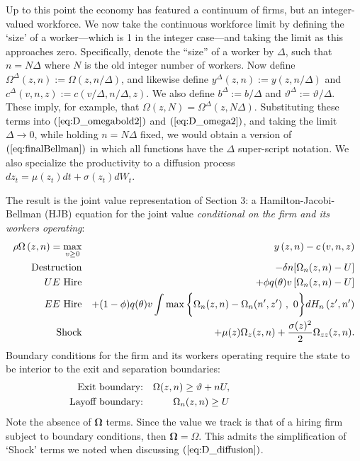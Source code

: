 Up to this point the economy has featured a continuum of firms, but an
integer-valued workforce. We now take the continuous workforce limit by
defining the `size' of a worker---which is 1 in the integer case---and
taking the limit as this approaches zero. Specifically, denote the ``size''
of a worker by $\Delta$, such that $n= N \Delta$ where $N$ is the old
integer number of workers. Now define ${\Omega}^\Delta(z,n) :=
\Omega(z,n/\Delta)$, and likewise define $y^{\Delta}(z,n):=y(z,n/\Delta)$ and
$c^\Delta(v,n,z):=c(v/\Delta,n/\Delta,z)$. We also define ${b}^\Delta:=b/\Delta
$ and ${\vartheta}^{\Delta}:=\vartheta/\Delta$. These imply, for example,
that $\Omega(z,N)={\Omega}^\Delta(z,N\Delta)$. Substituting these terms into
$(\ref{eq:D_omegabold2})$ and $(\ref{eq:D_omega2})$, and taking the limit $%
\Delta\rightarrow 0$, while holding $n=N\Delta$ fixed, we would obtain a
version of $(\ref{eq:finalBellman})$ in which all functions have the $\Delta$
super-script notation. We also specialize the productivity to a diffusion
process $dz_t=\mu(z_t)dt+\sigma(z_t)dW_t$.

The result is the joint value representation of Section 3: a Hamilton-Jacobi-Bellman (HJB) equation for the joint value \emph{conditional on the firm and its workers operating}:
\begin{eqnarray}  \label{eq:finalBellman}
\rho \Omega\left(z,n\right) =\max_{v \geq 0} && y\left(z,n\right) -c\left(
v,n,z\right) \\
\text{Destruction} &&-\delta n [\Omega_n(z,n) - U]  \notag \\
\text{$UE$ Hire} &&+\phi q(\theta)v \left[ \Omega_n(z,n) -U \right]  \notag
\\
\text{$EE$ Hire} &&+(1-\phi)q(\theta) v \int \max\bigg\{\Omega_n(z,n) -
\Omega_n(n^{\prime},z^{\prime}) \ , \ 0 \bigg\}d{H_n}\left( z^{\prime
},n^{\prime}\right)  \notag \\
\text{Shock} &&+\mu(z) \Omega_z(z,n) + \frac{\sigma(z)^2}{2}
\Omega_{zz}(z,n).  \notag
\end{eqnarray}
Boundary conditions for the firm and its workers operating require the state to be interior to the exit and separation boundaries:
\begin{eqnarray*}
\text{Exit boundary:}&& \Omega(z,n) \geq \vartheta + n U,
\quad\quad\quad\quad\quad\quad\quad  \notag \\
\text{Layoff boundary:}&& \Omega_n(z,n) \geq U
\quad\quad\quad\quad\quad\quad\quad  \notag
\end{eqnarray*}
Note the absence of $\bm{\Omega}$ terms. Since the value we
 track is that of a hiring firm subject to boundary conditions, then $%
\bm{\Omega}=\Omega$. This admits the simplification of `Shock' terms
we noted when discussing $(\ref{eq:D_diffusion})$.\\

